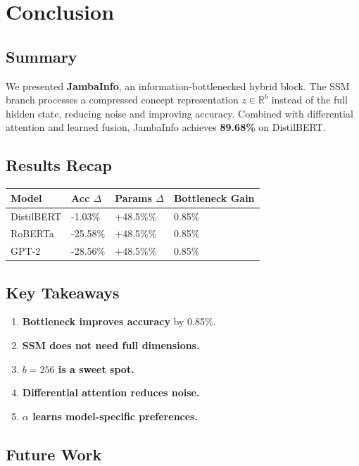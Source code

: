\section{Conclusion}

\subsection{Summary}

We presented \textbf{JambaInfo}, an information-bottlenecked hybrid block. The 
SSM branch processes a compressed concept representation $z \in \mathbb{R}^b$ 
instead of the full hidden state, reducing noise and improving accuracy. 
Combined with differential attention and learned fusion, JambaInfo achieves 
\textbf{89.68\%} on DistilBERT.

\subsection{Results Recap}

\begin{table}[H]
\centering
\small
\begin{tabular}{llll}
\toprule
\textbf{Model} & \textbf{Acc $\Delta$} & \textbf{Params $\Delta$} & \textbf{Bottleneck Gain} \\
\midrule
DistilBERT & -1.03\% & +48.5\%\% & 0.85\% \\
RoBERTa & -25.58\% & +48.5\%\% & 0.85\% \\
GPT-2 & -28.56\% & +48.5\%\% & 0.85\% \\
\bottomrule
\end{tabular}
\end{table}

\subsection{Key Takeaways}

\begin{enumerate}
\item \textbf{Bottleneck improves accuracy} by 0.85\%.
\item \textbf{SSM does not need full dimensions.}
\item \textbf{$b = 256$ is a sweet spot.}
\item \textbf{Differential attention reduces noise.}
\item \textbf{$\alpha$ learns model-specific preferences.}

\end{enumerate}
\subsection{Future Work}

